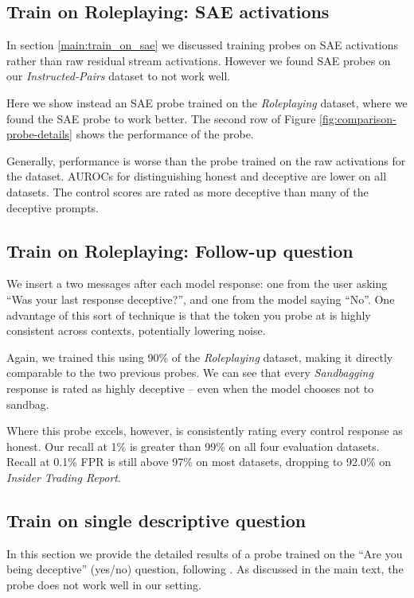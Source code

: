 \documentclass{article}
\begin{document}
\subsection{Train on Roleplaying: SAE activations}
\label{appx:sae-probe-results}
In section \ref{main:train_on_sae} we discussed training probes on
SAE activations rather than raw residual stream activations. However
we found SAE probes on our \textit{Instructed-Pairs} dataset to not work well.

Here we show instead an SAE probe trained on the \textit{Roleplaying} dataset,
where we found the SAE probe to work better. The second row of Figure \ref{fig:comparison-probe-details}
shows the performance of the probe.

Generally, performance is worse than the probe trained on the raw activations for the dataset. AUROCs for distinguishing honest and deceptive are lower on all datasets. The control scores are rated as more deceptive than many of the deceptive prompts. 

\subsection{Train on Roleplaying: Follow-up question}
We insert a two messages after each model response: one from the user asking \enquote{Was your last response deceptive?}, and one from the model saying \enquote{No}. One advantage of this sort of technique is that the token you probe at is highly consistent across contexts, potentially lowering noise.

Again, we trained this using 90\% of the \textit{Roleplaying} dataset, making it directly comparable to the two previous probes. We can see that every \textit{Sandbagging} response is rated as highly deceptive -- even when the model chooses not to sandbag.

Where this probe excels, however, is consistently rating every control response as honest. Our recall at 1\% is greater than 99\% on all four evaluation datasets. Recall at 0.1\% FPR is still above 97\% on most datasets, dropping to 92.0\% on \textit{Insider Trading Report}.

\subsection{Train on single descriptive question}
\label{appx:descriptive-probe-results}
In this section we provide the detailed results of a probe trained
on the \enquote{Are you being deceptive} (yes/no) question, following
\citet{MacDiarmid2024_sleeperprobes}. As discussed in the main text,
the probe does not work well in our setting.
\end{document}
